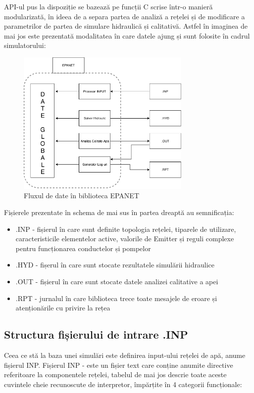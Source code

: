 API-ul pus la dispoziție se bazează pe funcții C scrise  într-o manieră modularizată, în ideea de a separa partea de analiză a rețelei și de modificare a parametrilor de partea de simulare hidraulică și calitativă. Astfel în imaginea de mai jos este prezentată modalitatea în care datele ajung și sunt folosite în cadrul simulatorului:

\begin{figure}[H]
\label{fig:EPANET_dataflow}
\centering
\includegraphics[width=0.75\textwidth]{pics/c2_pics/epanet_dataflow.pdf}
\caption{Fluxul de date în biblioteca EPANET}
\end{figure}

\begin{flushleft}
Fișierele prezentate în schema de mai sus în partea dreaptă au semnificația:
\end{flushleft}
\begin{itemize}
    \item .INP - fișierul în care sunt definite topologia rețelei, tiparele de utilizare, caracteristicile elementelor active, valorile de Emitter și reguli complexe pentru funcționarea conductelor și pompelor
    \item .HYD - fișerul în care sunt stocate rezultatele simulării hidraulice
    \item .OUT - fișierul în care sunt stocate datele analizei calitative a apei
    \item .RPT - jurnalul în care biblioteca trece toate mesajele de eroare și atenționările cu privire la rețea
\end{itemize}

\subsection{Structura fișierului de intrare .INP}
Ceea ce stă la baza unei simulări este definirea input-ului rețelei de apă, anume fișierul INP. Fișierul INP - este un fișier text care conține anumite directive referitoare la componentele rețelei, 
tabelul de mai jos descrie toate aceste cuvintele cheie recunoscute de interpretor, împărțite în 4 categorii funcționale:

